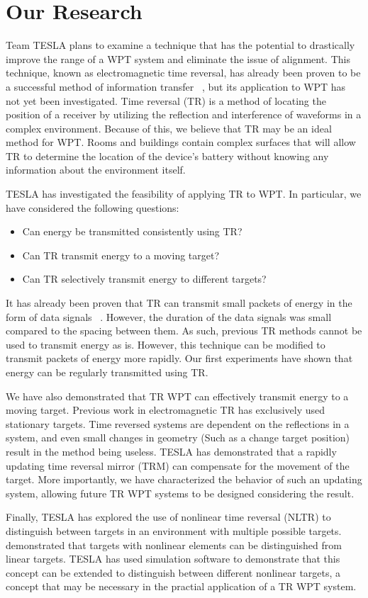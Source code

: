 \section{Our Research}
Team TESLA plans to examine a technique that has the potential to drastically improve the range of a WPT system and eliminate the issue of alignment. This technique, known as electromagnetic time reversal, has already been proven to be a successful method of information transfer ~\cite{nltr-wave-chaotic,cepni2005experimental}, but its application to WPT has not yet been investigated. Time reversal (TR) is a method of locating the position of a receiver by utilizing the reflection and interference of waveforms in a complex environment. Because of this, we believe that TR may be an ideal method for WPT. Rooms and buildings contain complex surfaces that will allow TR to determine the location of the device's battery without knowing any information about the environment itself.

TESLA has investigated the feasibility of applying TR to WPT. In particular, we have considered the following questions:
\begin{itemize}
\item Can energy be transmitted consistently using TR?
\item Can TR transmit energy to a moving target?
\item Can TR selectively transmit energy to different targets?
\end{itemize}

It has already been proven that TR can transmit small packets of energy in the form of data signals ~\cite{nltr-wave-chaotic}. However, the duration of the data signals was small compared to the spacing between them. As such, previous TR methods cannot be used to transmit energy as is.  However, this technique can be modified to transmit packets of energy more rapidly. Our first experiments have shown that energy can be regularly transmitted using TR.

We have also demonstrated that TR WPT can effectively transmit energy to a moving target. Previous work in electromagnetic TR has exclusively used stationary targets. Time reversed systems are dependent on the reflections in a system, and even small changes in geometry (Such as a change target position) result in the method being useless.  TESLA has demonstrated that a rapidly updating time reversal mirror (TRM) can compensate for the movement of the target.  More importantly, we have characterized the behavior of such an updating system, allowing future TR WPT systems to be designed considering the result.

Finally, TESLA has explored the use of nonlinear time reversal (NLTR) to distinguish between targets in an environment with multiple possible targets. \cite{nltr-wave-chaotic} demonstrated that targets with nonlinear elements can be distinguished from linear targets.  TESLA has used simulation software to demonstrate that this concept can be extended to distinguish between different nonlinear targets, a concept that may be necessary in the practial application of a TR WPT system.
